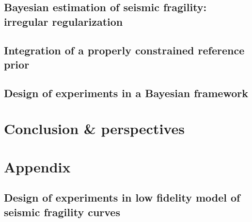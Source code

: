 \documentclass[a4paper]{book}
\begin{document}



\chapter{Bayesian estimation of seismic fragility: irregular regularization}




\chapter{Integration of a properly constrained reference prior}




\chapter{Design of experiments in a Bayesian framework}






\part{Conclusion \& perspectives}


\appendix
\part*{Appendix}


\chapter{Design of experiments in low fidelity model of seismic fragility curves}


 
 
\printbibliography 
{}
\end{document}
